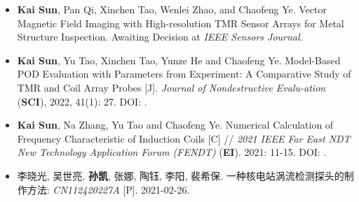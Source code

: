 \vspace{6pt}
\begin{itemize}
    \item \textbf{Kai Sun}, Pan Qi, Xinchen Tao, Wenlei Zhao, and Chaofeng Ye. Vector Magnetic Field Imaging with High-resolution TMR Sensor Arrays for Metal Structure Inspection. Awaiting Decision at \emph{IEEE Sensors Journal}.
    \\{ \footnotesize {}}

    \item \textbf{Kai Sun}, Yu Tao, Xinchen Tao, Yunze He and Chaofeng Ye. Model-Based POD Evaluation with Parameters from Experiment: A Comparative Study of TMR and Coil Array Probes [J]. \textsl{Journal of Nondestructive Evalu-ation} (\textbf{SCI}), 2022, 41(1): 27. DOI: .
    \\{ \footnotesize {}}

    \item \textbf{Kai Sun}, Na Zhang, Yu Tao and Chaofeng Ye. Numerical Calculation of Frequency Characteristic of Induction Coils [C] // \textsl{2021 IEEE Far East NDT New Technology Application Forum (FENDT)} (\textbf{EI}). 2021: 11-15. DOI: .
    \\{ \footnotesize {}}

    \item 李晓光, 吴世亮, \textbf{孙凯}, 张娜, 陶钰, 李阳, 裴希保. 一种核电站涡流检测探头的制作方法: \textsl{CN112420227A} [P]. 2021-02-26.
\end{itemize}
